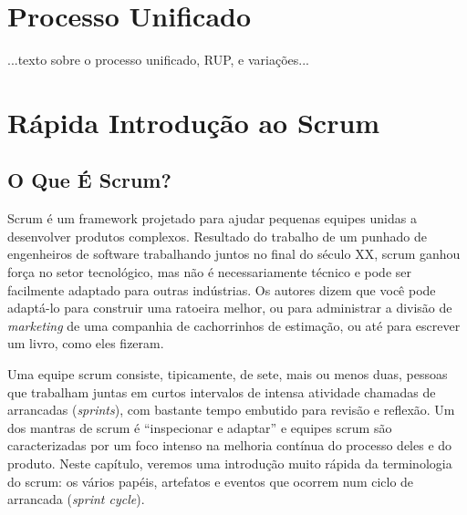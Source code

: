 \documentclass[
	11pt,				%
	openright,
	twoside,			%
	a4paper,			%
	english,			%
	french,
	brazil,				%
	sumario=tradicional
	]{abntex2}
\begin{document}
\section{Processo Unificado}
...texto sobre o processo unificado, RUP, e variações...

\section{Rápida Introdução ao Scrum}

\subsection{O Que É Scrum?}
Scrum é um framework projetado para ajudar pequenas equipes unidas a desenvolver produtos complexos. Resultado do trabalho de um punhado de engenheiros de software trabalhando juntos no final do século XX, scrum ganhou força no setor tecnológico, mas não é necessariamente técnico e pode ser facilmente adaptado para outras indústrias. Os autores  dizem que você pode adaptá-lo para construir uma ratoeira melhor, ou para administrar a divisão de \textit{marketing} de uma companhia de cachorrinhos de estimação, ou até para escrever um livro, como eles fizeram.

Uma equipe scrum consiste, tipicamente, de sete, mais ou menos duas, pessoas que trabalham juntas em curtos intervalos de intensa atividade chamadas de arrancadas (\emph{sprints}), com bastante tempo embutido para revisão e reflexão. Um dos mantras de scrum é ``inspecionar e adaptar'' e equipes scrum são caracterizadas por um foco intenso  na melhoria contínua do processo deles e do produto. Neste capítulo, veremos uma introdução muito rápida da terminologia do scrum: os vários papéis, artefatos e eventos que ocorrem num ciclo de arrancada (\emph{sprint cycle}).
\end{document}
